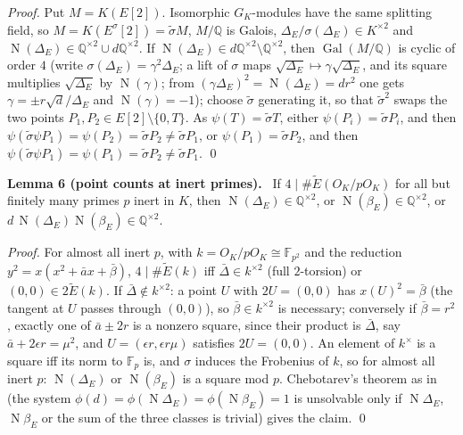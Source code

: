 \documentclass[11pt]{article}
\newenvironment{statement}[1]{\par\medskip\noindent\phantomsection\textbf{#1}\ }{\par\medskip}
\newcommand{\Q}{\mathbb Q}
\newcommand{\F}{\mathbb F}
\DeclareMathOperator{\Gal}{Gal}
\DeclareMathOperator{\Norm}{N}
\begin{document}
\emph{Proof.} Put \(M=K(E[2])\). Isomorphic \(G_K\)-modules have the same splitting field, so
\(M=K(E^\sigma[2])=\tilde\sigma M\), \(M/\Q\) is Galois, \(\Delta_E/\sigma(\Delta_E)\in K^{\times2}\) and
\(\Norm(\Delta_E)\in\Q^{\times2}\cup d\Q^{\times2}\). If \(\Norm(\Delta_E)\in d\Q^{\times2}\setminus\Q^{\times2}\),
then \(\Gal(M/\Q)\) is cyclic of order \(4\) (write \(\sigma(\Delta_E)=\gamma^2\Delta_E\); a lift of \(\sigma\) maps
\(\sqrt{\Delta_E}\mapsto\gamma\sqrt{\Delta_E}\), and its square multiplies \(\sqrt{\Delta_E}\) by \(\Norm(\gamma)\);
from \((\gamma\Delta_E)^2=\Norm(\Delta_E)=dr^2\) one gets \(\gamma=\pm r\sqrt d/\Delta_E\) and
\(\Norm(\gamma)=-1\)); choose \(\tilde\sigma\) generating it, so that \(\tilde\sigma^2\) swaps the two points
\(P_1,P_2\in E[2]\setminus\{0,T\}\). As \(\psi(T)=\tilde\sigma T\), either \(\psi(P_i)=\tilde\sigma P_i\), and then
\(\psi(\tilde\sigma\psi P_1)=\psi(P_2)=\tilde\sigma P_2\neq\tilde\sigma P_1\), or \(\psi(P_1)=\tilde\sigma P_2\), and
then \(\psi(\tilde\sigma\psi P_1)=\psi(P_1)=\tilde\sigma P_2\neq\tilde\sigma P_1\). \qed

\begin{statement}{Lemma 6 (point counts at inert primes).}\label{lemma-cheb}
If \(4\mid\#\widetilde E(O_K/pO_K)\) for all but finitely many primes \(p\) inert in \(K\), then
\(\Norm(\Delta_E)\in\Q^{\times2}\), or \(\Norm(\beta_E)\in\Q^{\times2}\), or
\(d\,\Norm(\Delta_E)\Norm(\beta_E)\in\Q^{\times2}\).
\end{statement}

\emph{Proof.} For almost all inert \(p\), with \(k=O_K/pO_K\cong\F_{p^2}\) and the reduction
\(y^2=x(x^2+\bar ax+\bar\beta)\), \(4\mid\#\widetilde E(k)\) iff \(\bar\Delta\in k^{\times2}\) (full \(2\)-torsion) or
\((0,0)\in2\widetilde E(k)\). If \(\bar\Delta\notin k^{\times2}\): a point \(U\) with \(2U=(0,0)\) has
\(x(U)^2=\bar\beta\) (the tangent at \(U\) passes through \((0,0)\)), so \(\bar\beta\in k^{\times2}\) is necessary;
conversely if \(\bar\beta=r^2\), exactly one of \(\bar a\pm2r\) is a nonzero square, since their product is
\(\bar\Delta\), say \(\bar a+2\epsilon r=\mu^2\), and \(U=(\epsilon r,\epsilon r\mu)\) satisfies \(2U=(0,0)\). An
element of \(k^\times\) is a square iff its norm to \(\F_p\) is, and \(\sigma\) induces the Frobenius of \(k\), so
for almost all inert \(p\): \(\Norm(\Delta_E)\) or \(\Norm(\beta_E)\) is a square mod \(p\). Chebotarev's theorem as
in \cite[Lemma~6]{P2210} (the system \(\phi(d)=\phi(\Norm\Delta_E)=\phi(\Norm\beta_E)=1\) is unsolvable only if
\(\Norm\Delta_E\), \(\Norm\beta_E\) or the sum of the three classes is trivial) gives the claim. \qed
\end{document}
